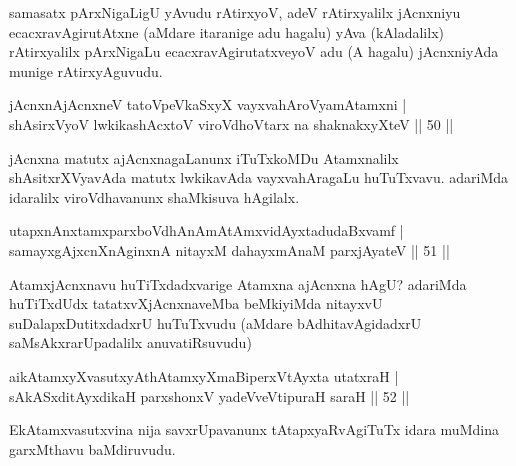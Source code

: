 \begin{artha}
samasatx pArxNigaLigU yAvudu rAtirxyoV, adeV rAtirxyalilx jAcnxniyu ecacxravAgirutAtxne (aMdare itaranige adu hagalu) yAva (kAladalilx) rAtirxyalilx pArxNigaLu ecacxravAgirutatxveyoV adu (A hagalu) jAcnxniyAda munige rAtirxyAguvudu.
\end{artha}

\begin{shl}
jAcnxnAjAcnxneV tatoV\s peVkaSxyX vayxvahAroV\s yamAtamxni |\\
shAsirxVyoV lwkikashAcxtoV viroVdhoV\s tarx na shaknakxyXteV \hfill || 50 ||
\end{shl}

\begin{artha}%
jAcnxna matutx ajAcnxnagaLanunx iTuTxkoMDu Atamxnalilx shAsitxrXVyavAda matutx lwkikavAda vayxvahAragaLu huTuTxvavu. adariMda idaralilx viroVdhavanunx shaMkisuva hAgilalx.
\end{artha}


\begin{shl}
utapxnAnxtamxparxboVdhAnAmAtAmxvidAyxtadudaBxvamf |\\
samayxgAjxcnXnAginxnA nitayxM dahayxmAnaM parxjAyateV \hfill || 51 ||
\end{shl}

\begin{artha}
AtamxjAcnxnavu huTiTxdadxvarige Atamxna ajAcnxna hAgU? adariMda huTiTxdUdx tatatxvXjAcnxnaveMba beMkiyiMda nitayxvU suDalapxDutitxdadxrU huTuTxvudu (aMdare bAdhitavAgidadxrU saMsAkxrarUpadalilx anuvatiRsuvudu) 
\end{artha}

\begin{shl}
aikAtamxyXvasutxyAthAtamxyXmaBiperxVtAyxta utatxraH |\\
sAkASxditAyxdikaH parxshonxV yadeVveVtipuraH saraH \hfill || 52 ||
\end{shl}

\begin{artha}
EkAtamxvasutxvina nija savxrUpavanunx tAtapxyaRvAgiTuTx idara muMdina garxMthavu baMdiruvudu. 
\end{artha}


